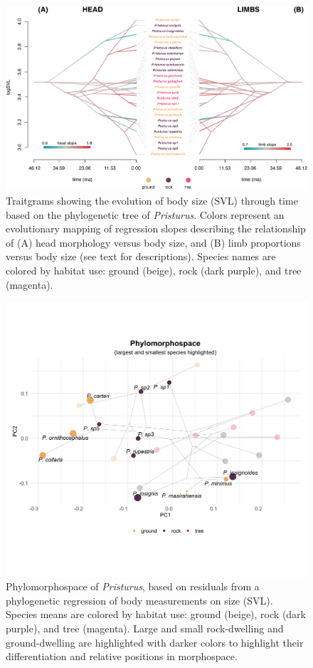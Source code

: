 \documentclass[
  11pt,
]{article}
\begin{document}
\newpage

\begin{figure}
\includegraphics[width=1\linewidth]{Figs/figure_phenograms} \caption{Traitgrams showing the evolution of body size (SVL) through time based on the phylogenetic tree of \textit{Pristurus}. Colors represent an evolutionary mapping of regression slopes describing the relationship of (A) head morphology versus body size, and (B) limb proportions versus body size (see text for descriptions). Species names are colored by habitat use: ground (beige), rock (dark purple), and tree (magenta).}\label{fig:unnamed-chunk-5}
\end{figure}

\newpage

\begin{figure}
\includegraphics[width=1\linewidth]{Figs/phylomorphospace_large_small} \caption{Phylomorphospace of \textit{Pristurus}, based on residuals from a phylogenetic regression of body measurements on size (SVL). Species means are colored by habitat use: ground (beige), rock (dark purple), and tree (magenta). Large and small rock-dwelling and ground-dwelling are highlighted with darker colors to highlight their differentiation and relative positions in morphospace.}\label{fig:unnamed-chunk-6}
\end{figure}
\end{document}
